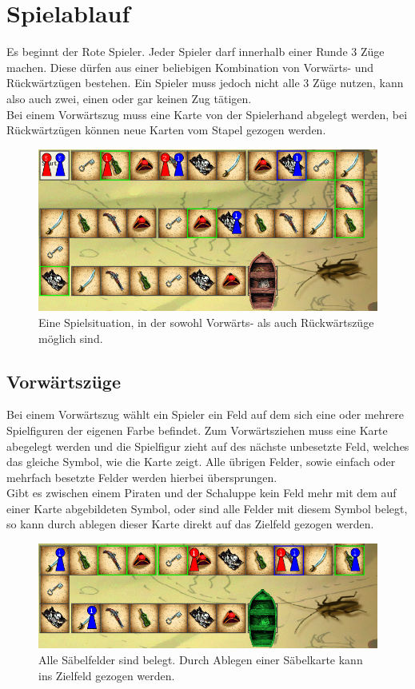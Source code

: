 \documentclass{scrartcl}
\begin{document}
\section{Spielablauf}
	Es beginnt der Rote Spieler. Jeder Spieler darf innerhalb einer Runde 3 Züge
	machen. Diese dürfen aus einer beliebigen Kombination von Vorwärts- und
	Rückwärtzügen bestehen. Ein Spieler muss jedoch nicht alle 3 Züge nutzen,
	kann also auch zwei, einen oder gar keinen Zug tätigen.\\
	Bei einem Vorwärtszug muss eine Karte von der Spielerhand abgelegt werden, bei
	Rückwärtzügen können neue Karten vom Stapel gezogen werden.
	
	\begin{figure}[h]
		\label{fig:PossibleMoves}
		\centering
		\includegraphics[width=\linewidth]{bilder/Moves}
		\caption{Eine Spielsituation, in der sowohl Vorwärts- als auch Rückwärtszüge
		möglich sind.}
	\end{figure}
	\subsection{Vorwärtszüge}
	Bei einem Vorwärtszug wählt ein Spieler ein Feld auf dem sich eine oder mehrere
	Spielfiguren der eigenen Farbe befindet. Zum Vorwärtsziehen muss eine Karte
	abegelegt werden und die Spielfigur zieht auf des nächste unbesetzte Feld,
	welches das gleiche Symbol, wie die Karte zeigt. Alle übrigen Felder, sowie
	einfach oder mehrfach besetzte Felder werden hierbei übersprungen.\\
	Gibt es zwischen einem Piraten und der Schaluppe kein Feld mehr mit dem auf
	einer Karte abgebildeten Symbol, oder sind alle Felder mit diesem Symbol
	belegt, so kann durch ablegen dieser Karte direkt auf das Zielfeld gezogen werden.
	\begin{figure}[h]
		\centering
		\label{fig:Zielfeld}
		\includegraphics[width=\linewidth]{bilder/zielfeld}
		\caption{Alle Säbelfelder sind belegt. Durch Ablegen einer Säbelkarte kann
		ins Zielfeld gezogen werden.}
	\end{figure}
\end{document}
